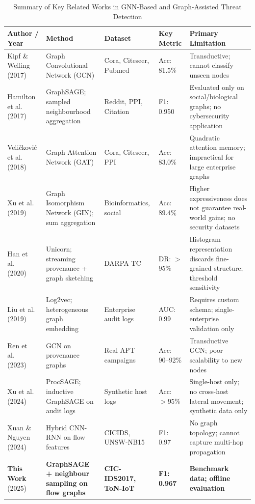 \documentclass[conference]{IEEEtran}
\begin{document}
\begin{table}[t]
\centering
\caption{Summary of Key Related Works in GNN-Based and Graph-Assisted Threat Detection}
\label{tab:related_work}
\renewcommand{\arraystretch}{1.25}
\begin{tabular}{p{2.8cm} p{3.4cm} p{2.6cm} p{2.4cm} p{4.2cm}}
\toprule
\textbf{Author / Year} & \textbf{Method} & \textbf{Dataset} & \textbf{Key Metric} & \textbf{Primary Limitation} \\
\midrule
Kipf \& Welling \cite{kipf2017} (2017) & Graph Convolutional Network (GCN) & Cora, Citeseer, Pubmed & Acc: 81.5\% & Transductive; cannot classify unseen nodes \\
Hamilton et al.\ \cite{hamilton2017} (2017) & GraphSAGE; sampled neighbourhood aggregation & Reddit, PPI, Citation & F1: 0.950 & Evaluated only on social/biological graphs; no cybersecurity application \\
Veli\v{c}kovi\'{c} et al.\ \cite{velickovic2018} (2018) & Graph Attention Network (GAT) & Cora, Citeseer, PPI & Acc: 83.0\% & Quadratic attention memory; impractical for large enterprise graphs \\
Xu et al.\ \cite{xu2019gin} (2019) & Graph Isomorphism Network (GIN); sum aggregation & Bioinformatics, social & Acc: 89.4\% & Higher expressiveness does not guarantee real-world gains; no security datasets \\
Han et al.\ \cite{han2020} (2020) & Unicorn; streaming provenance + graph sketching & DARPA TC & DR: $>$95\% & Histogram representation discards fine-grained structure; threshold sensitivity \\
Liu et al.\ \cite{liu2018} (2019) & Log2vec; heterogeneous graph embedding & Enterprise audit logs & AUC: 0.99 & Requires custom schema; single-enterprise validation only \\
Ren et al.\ \cite{ren2023} (2023) & GCN on provenance graphs & Real APT campaigns & Acc: 90--92\% & Transductive GCN; poor scalability to new nodes \\
Xu et al.\ \cite{xu2024} (2024) & ProcSAGE; inductive GraphSAGE on audit logs & Synthetic host logs & Acc: $>$95\% & Single-host only; no cross-host lateral movement; synthetic data only \\
Xuan \& Nguyen \cite{xuan2024} (2024) & Hybrid CNN-RNN on flow features & CICIDS, UNSW-NB15 & F1: 0.97 & No graph topology; cannot capture multi-hop propagation \\
\textbf{This Work} (2025) & \textbf{GraphSAGE + neighbour sampling on flow graphs} & \textbf{CIC-IDS2017, ToN-IoT} & \textbf{F1: 0.967} & \textbf{Benchmark data; offline evaluation} \\
\bottomrule
\end{tabular}
\end{table}
\end{document}
